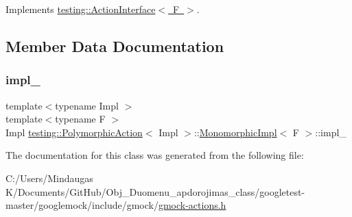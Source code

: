 Implements \mbox{\hyperlink{classtesting_1_1_action_interface_a20f8624fcea1786f2992b358760422a0}{testing\+::\+Action\+Interface$<$ F $>$}}.



\subsection{Member Data Documentation}
\mbox{\label{classtesting_1_1_polymorphic_action_1_1_monomorphic_impl_a77375e13255f50b45498e0d9c2395d72}} 
\subsubsection{\texorpdfstring{impl\_}{impl\_}}
{\footnotesize\ttfamily template$<$typename Impl $>$ \\
template$<$typename F $>$ \\
Impl \mbox{\hyperlink{classtesting_1_1_polymorphic_action}{testing\+::\+Polymorphic\+Action}}$<$ Impl $>$\+::\mbox{\hyperlink{classtesting_1_1_polymorphic_action_1_1_monomorphic_impl}{Monomorphic\+Impl}}$<$ F $>$\+::impl\+\_\+\hspace{0.3cm}{\ttfamily [private]}}



The documentation for this class was generated from the following file\+:\begin{DoxyCompactItemize}
\item 
C\+:/\+Users/\+Mindaugas K/\+Documents/\+Git\+Hub/\+Obj\+\_\+\+Duomenu\+\_\+apdorojimas\+\_\+class/googletest-\/master/googlemock/include/gmock/\mbox{\hyperlink{googletest-master_2googlemock_2include_2gmock_2gmock-actions_8h}{gmock-\/actions.\+h}}\end{DoxyCompactItemize}
